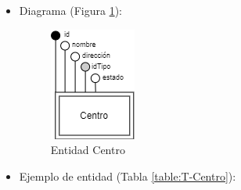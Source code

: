 \begin{itemize}
\begin{itemize}
        \item dirección
        \begin{itemize}
            \item Definición: dirección donde se encuentra el centro.
            \item Dominio: conjunto de 250 caracteres.
            \item Tipo: atributo simple.
            \item Opcional: no
            \item Ejemplo: Campus de Rabanales
        \end{itemize}

        \item estado
        \begin{itemize}
            \item Definición: estado del centro.
            \item Dominio: 1 (Habilitado), 0 (Deshabilitado).
            \item Tipo: atributo simple.
            \item Opcional: no
            \item Ejemplo: 1
        \end{itemize}
    \end{itemize}

    \item Diagrama (Figura \ref{fig:E-Centro}):

    \begin{figure}[H]
        \centering
        \includegraphics[scale=0.8]{img/diagramas/EER/E-Centro.png}
        \caption{Entidad Centro}
        \label{fig:E-Centro}
    \end{figure}

    \item Ejemplo de entidad (Tabla \ref{table:T-Centro}):


\end{itemize}
